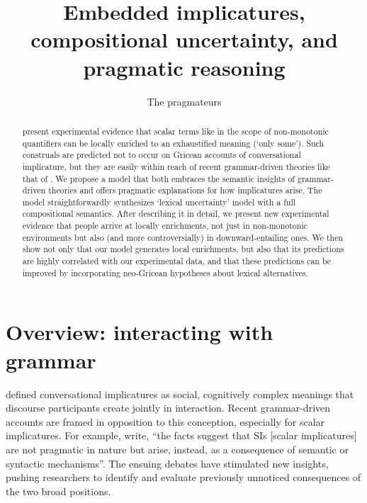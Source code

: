 \documentclass[leqno]{article}
\begin{document}

\title{Embedded implicatures, compositional uncertainty, and pragmatic reasoning}
\author{The pragmateurs}
\maketitle

\begin{abstract} 
  \citet{Chemla:Spector:2011} present experimental evidence that
  scalar terms like  in the scope of non-monotonic
  quantifiers can be locally enriched to an exhaustified meaning
  (`only some'). Such construals are predicted not to occur on Gricean
  accounts of conversational implicature, but they are easily within
  reach of recent grammar-driven theories like that of
  \citealt{ChierchiaFoxSpector08}.  We propose a model that both
  embraces the semantic insights of grammar-driven theories and offers
  pragmatic explanations for how implicatures arise. The model
  straightforwardly synthesizes 
  `lexical uncertainty' model with a full compositional
  semantics. After describing it in detail, we present new
  experimental evidence that people arrive at locally enrichments, not
  just in non-monotonic environments but also (and more
  controversially) in downward-entailing ones. We then show not only
  that our model generates local enrichments, but also that its
  predictions are highly correlated with our experimental data, and
  that these predictions can be improved by incorporating neo-Gricean
  hypotheses about lexical alternatives.
\end{abstract}


\section{Overview: interacting with grammar}\label{sec:introduction}

\citet{Grice75} defined conversational implicatures as social,
cognitively complex meanings that discourse participants create
jointly in interaction. Recent grammar-driven accounts are framed in
opposition to this conception, especially for scalar implicatures.
For example,  write, ``the facts
suggest that SIs [scalar implicatures] are not pragmatic in nature but
arise, instead, as a consequence of semantic or syntactic
mechanisms''. The ensuing debates have stimulated new insights,
pushing researchers to identify and evaluate previously unnoticed
consequences of the two broad positions.
\end{document}
